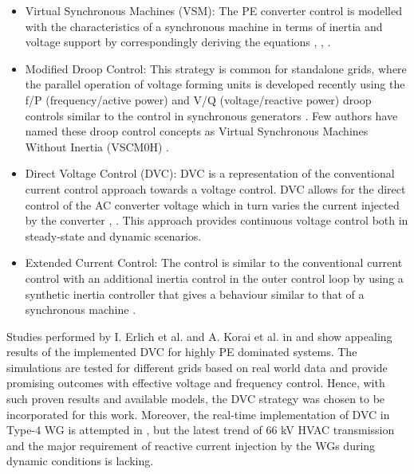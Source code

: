 \begin{itemize}
    \item Virtual Synchronous Machines (VSM): The \gls{PE} converter control is modelled with the characteristics of a synchronous machine in terms of inertia and voltage support by correspondingly deriving the equations \cite{markovic2018lqr}, \cite{duckwitz_operating_behavior}, \cite{lu_virtual_2019}.
    
    \item Modified Droop Control:
    This strategy is common for standalone grids, where the parallel operation of voltage forming units is developed recently using the f/P (frequency/active power) and V/Q (voltage/reactive power) droop controls similar to the control in synchronous generators \cite{bouzid2016simulation}. Few authors have named these droop control concepts as Virtual Synchronous Machines Without Inertia (VSCM0H) \cite{yu2016use}.
    
    \item Direct Voltage Control (\gls{DVC}):
    \gls{DVC} is a representation of the conventional current control approach towards a voltage control. \gls{DVC} allows for the direct control of the \gls{AC} converter voltage which in turn varies the current injected by the converter  \cite{korai_dynamic_2019}, \cite{erlich_new_2017}. This approach provides continuous voltage control both in steady-state and dynamic scenarios. %
    
    \item Extended Current Control:
    The control is similar to the conventional current control with an additional inertia control in the outer control loop by using a synthetic inertia controller that gives a behaviour similar to that of a synchronous machine \cite{duckwitz_derivation_2019} \cite{liu2017control}. 
\end{itemize}

Studies performed by I. Erlich et al. and A. Korai et al. in \cite{erlich_new_2017} and \cite{korai_dynamic_2019} show appealing results of the implemented \gls{DVC} for highly \gls{PE} dominated systems. The simulations are tested for different grids based on real world data and provide promising outcomes with effective voltage and frequency control. Hence, with such proven results and available models, the \gls{DVC} strategy was chosen to be incorporated for this work. Moreover, the real-time implementation of \gls{DVC} in Type-4 \gls{WG} is attempted in \cite{sethi_real-time_nodate-new}, but the latest trend of 66 kV \gls{HVAC} transmission and the major requirement of reactive current injection by the \gls{WG}s during dynamic conditions is lacking.

